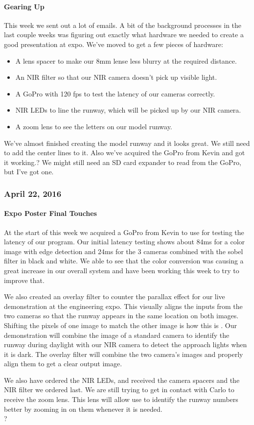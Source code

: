 \paragraph{Gearing Up}
This week we sent out a lot of emails. A bit of the background processes in the last couple weeks was figuring out exactly what hardware we needed to create a good presentation at expo. We've moved to get a few pieces of hardware:

\begin{itemize}[leftmargin=2cm,labelindent=2cm]
\item A lens spacer to make our 8mm lense less blurry at the required distance.
\item An NIR filter so that our NIR camera doesn't pick up visible light.
\item A GoPro with 120 fps to test the latency of our cameras correctly.
\item NIR LEDs to line the runway, which will be picked up by our NIR camera.
\item A zoom lens to see the letters on our model runway.
\end{itemize}

We've almost finished creating the model runway and it looks great. We still need to add the center lines to it. Also we've acquired the GoPro from Kevin and got it working.? We might still need an SD card expander to read from the GoPro, but I've got one.\\

\subsubsection{April 22, 2016}
\paragraph{Expo Poster Final Touches}
At the start of this week we acquired a GoPro from Kevin to use for testing the latency of our program. Our initial latency testing shows about 84ms for a color image with edge detection and 24ms for the 3 cameras combined with the sobel filter in black and white. We able to see that the color conversion was causing a great increase in our overall system and have been working this week to try to improve that. 
\par
We also created an overlay filter to counter the parallax effect for our live demonstration at the engineering expo. This visually aligns the inputs from the two cameras so that the runway appears in the same location on both images. Shifting the pixels of one image to match the other image is how this is . Our demonstration will combine the image of a standard camera to identify the runway during daylight with our NIR camera to detect the approach lights when it is dark. The overlay filter will combine the two camera's images and properly align them to get a clear output image.
\par
We also have ordered the NIR LEDs, and received the camera spacers and the NIR filter we ordered last. We are still trying to get in contact with Carlo to receive the zoom lens. This lens will allow use to identify the runway numbers better by zooming in on them whenever it is needed.\\?

